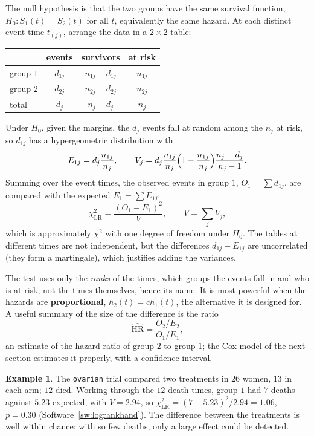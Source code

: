 \documentclass[11pt,a4paper]{article}
\numberwithin{equation}{section}
\theoremstyle{definition}
\newtheorem{exa}[thm]{Example}
\begin{document}
The null hypothesis is that the two groups have the same survival function, $H_0: S_1(t) = S_2(t)$ for all $t$, equivalently the same hazard. At each distinct event time $t_{(j)}$, arrange the data in a $2 \times 2$ table:
\begin{center}
\small
\begin{tabular}{l|cc|c}
 & events & survivors & at risk \\
\hline
group $1$ & $d_{1j}$ & $n_{1j} - d_{1j}$ & $n_{1j}$ \\
group $2$ & $d_{2j}$ & $n_{2j} - d_{2j}$ & $n_{2j}$ \\
\hline
total & $d_j$ & $n_j - d_j$ & $n_j$
\end{tabular}
\end{center}
Under $H_0$, given the margins, the $d_j$ events fall at random among the $n_j$ at risk, so $d_{1j}$ has a hypergeometric distribution with
\[
E_{1j} = d_j\frac{n_{1j}}{n_j}, \qquad V_j = d_j\frac{n_{1j}}{n_j}\Bigl(1 - \frac{n_{1j}}{n_j}\Bigr)\frac{n_j - d_j}{n_j - 1} .
\]
Summing over the event times, the observed events in group $1$, $O_1 = \sum d_{1j}$, are compared with the expected $E_1 = \sum E_{1j}$:
\[
\chi^2_{\text{LR}} = \frac{(O_1 - E_1)^2}{V}, \qquad V = \sum_jV_j ,
\]
which is approximately $\chi^2$ with one degree of freedom under $H_0$. The tables at different times are not independent, but the differences $d_{1j} - E_{1j}$ are uncorrelated (they form a martingale), which justifies adding the variances.

The test uses only the \emph{ranks} of the times, which groups the events fall in and who is at risk, not the times themselves, hence its name. It is most powerful when the hazards are \textbf{proportional}, $h_2(t) = ch_1(t)$, the alternative it is designed for. A useful summary of the size of the difference is the ratio
\[
\widehat{\text{HR}} = \frac{O_2/E_2}{O_1/E_1} ,
\]
an estimate of the hazard ratio of group $2$ to group $1$; the Cox model of the next section estimates it properly, with a confidence interval.

\begin{exa}
\label{ex:ovarian}
The \texttt{ovarian} trial compared two treatments in $26$ women, $13$ in each arm; $12$ died. Working through the $12$ death times, group $1$ had $7$ deaths against $5.23$ expected, with $V = 2.94$, so $\chi^2_{\text{LR}} = (7 - 5.23)^2/2.94 = 1.06$, $p = 0.30$ (Software~\ref{sw:logrankhand}). The difference between the treatments is well within
chance: with so few deaths, only a large effect could be detected.
\end{exa}
\end{document}
